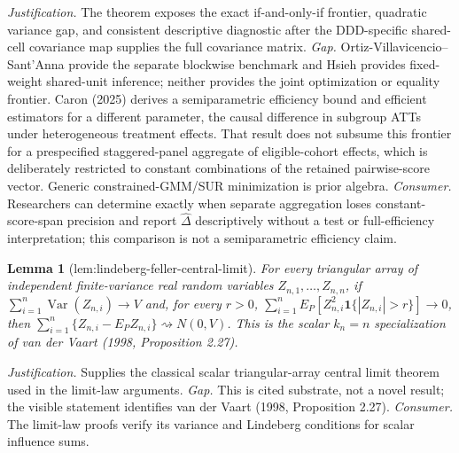 \documentclass{article}
\newtheorem{lemma}{Lemma}
\begin{document}
\par\smallskip\noindent \textit{Justification.} The theorem exposes the exact if-and-only-if frontier, quadratic variance gap, and consistent descriptive diagnostic after the DDD-specific shared-cell covariance map supplies the full covariance matrix. \textit{Gap.} Ortiz-Villavicencio--Sant'Anna provide the separate blockwise benchmark and Hsieh provides fixed-weight shared-unit inference; neither provides the joint optimization or equality frontier. Caron (2025) derives a semiparametric efficiency bound and efficient estimators for a different parameter, the causal difference in subgroup ATTs under heterogeneous treatment effects. That result does not subsume this frontier for a prespecified staggered-panel aggregate of eligible-cohort effects, which is deliberately restricted to constant combinations of the retained pairwise-score vector. Generic constrained-GMM/SUR minimization is prior algebra. \textit{Consumer.} Researchers can determine exactly when separate aggregation loses constant-score-span precision and report \(\widehat\Delta\) descriptively without a test or full-efficiency interpretation; this comparison is not a semiparametric efficiency claim.

\begin{lemma}[lem:lindeberg-feller-central-limit]\label{lem:lindeberg-feller-central-limit}
For every triangular array of independent finite-variance real random variables \(Z_{n,1},\ldots,Z_{n,n}\), if \(\sum_{i=1}^n\operatorname{Var}(Z_{n,i})\to V\) and, for every \(r>0\), \(\sum_{i=1}^nE_P[Z_{n,i}^2\mathbf 1\{|Z_{n,i}|>r\}]\to0\), then \(\sum_{i=1}^n\{Z_{n,i}-E_PZ_{n,i}\}\rightsquigarrow N(0,V)\). This is the scalar \(k_n=n\) specialization of van der Vaart (1998, Proposition 2.27).
\end{lemma}
\par\smallskip\noindent \textit{Justification.} Supplies the classical scalar triangular-array central limit theorem used in the limit-law arguments. \textit{Gap.} This is cited substrate, not a novel result; the visible statement identifies van der Vaart (1998, Proposition 2.27). \textit{Consumer.} The limit-law proofs verify its variance and Lindeberg conditions for scalar influence sums.
\end{document}
